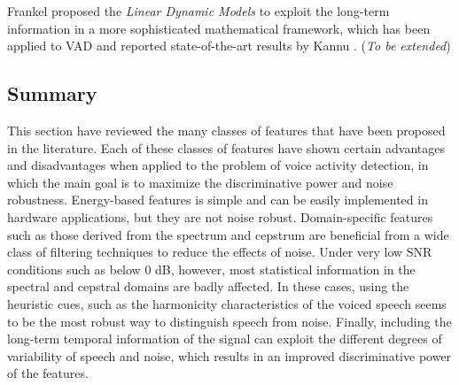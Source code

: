 Frankel \cite{frankel2003linear} proposed the \emph{Linear Dynamic Models} to exploit the long-term information in a more sophisticated mathematical framework, which has been applied to VAD and reported state-of-the-art results by Kannu \etal \cite{kannu2011linear}. (\emph{To be extended})

\subsection{Summary}
This section have reviewed the many classes of features that have been proposed in the literature. Each of these classes of features have shown certain advantages and disadvantages when applied to the problem of voice activity detection, in which the main goal is to maximize the discriminative power and noise robustness. Energy-based features is simple and can be easily implemented in hardware applications, but they are not noise robust. Domain-specific features such as those derived from the spectrum and cepstrum are beneficial from a wide class of filtering techniques to reduce the effects of noise. Under very low SNR conditions such as below 0 dB, however, most statistical information in the spectral and cepstral domains are badly affected. In these cases, using the heuristic cues, such as the harmonicity characteristics of the voiced speech seems to be the most robust way to distinguish speech from noise.
Finally, including the long-term temporal information of the signal can exploit the different degrees of variability of speech and noise, which results in an improved discriminative power of the features.

